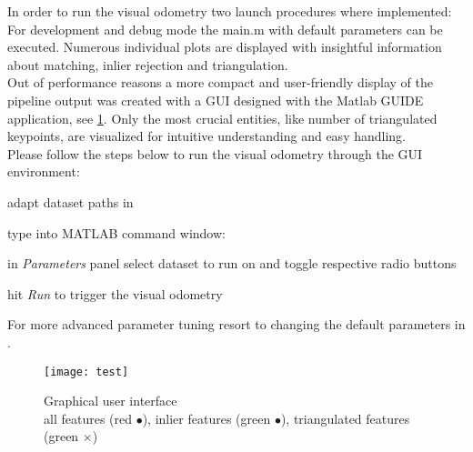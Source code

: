 In order to run the visual odometry two launch procedures where implemented: For development and debug mode the main.m with default parameters can be executed. Numerous individual plots are displayed with insightful information about matching, inlier rejection and triangulation.\\

Out of performance reasons a more compact and user-friendly display of the pipeline output was created with a GUI designed with the Matlab GUIDE application, see \cref{img_gui}. Only the most crucial entities, like number of triangulated keypoints, are visualized for intuitive understanding and easy handling.\\
Please follow the steps below to run the visual odometry through the GUI environment:
\begin{compactenum}
	\item adapt dataset paths in 
	\item type into MATLAB command window: 
	\item in \textit{Parameters} panel select dataset to run on and toggle respective radio buttons
	\item hit \textit{Run} to trigger the visual odometry\\
\end{compactenum}

For more advanced parameter tuning resort to changing the default parameters in .

\begin{figure}[ht]
	\centering
	\texttt{[image: test]}
	\captionsetup{justification=centering}
	\caption{Graphical user interface \\all features (red $\bullet$), inlier features (green $\bullet$), triangulated features (green $\times$)}
	\label{img_gui}
\end{figure}


\clearpage{\pagestyle{plain}\cleardoublepage}

\clearpage{\pagestyle{plain}\cleardoublepage}